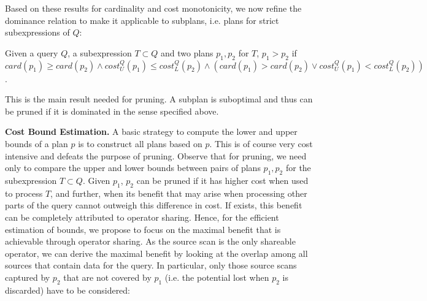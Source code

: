 Based on these results for cardinality and cost monotonicity, we now
refine the dominance relation to make it applicable to subplans,
i.e. plans for strict subexpressions of $Q$:

\begin{theorem}
  \label{def:dominates_bound}
  Given a query $Q$, a subexpression $T \subset Q$ and two plans
  $p_1,p_2$ for $T$, $p_1 > p_2$ if
  $card(p_1) \geq card(p_2) \wedge cost_U^Q(p_1) \leq cost_L^Q(p_2)
  \wedge (card(p_1) > card(p_2) \vee cost_U^Q(p_1) < cost_L^Q(p_2))$.
\end{theorem}

This is the main result needed for pruning. A subplan is suboptimal
and thus can be pruned if it is dominated in the sense specified
above.



\textbf{Cost Bound Estimation.} 
A basic strategy to compute the lower and upper bounds of a plan $p$
is to construct all plans based on $p$. This is of
course very cost intensive and defeats the purpose of pruning. Observe
that for pruning, we need only to compare the upper and lower bounds
between pairs of plans $p_1,p_2$ for the subexpression $T \subset
Q$. Given $p_1$, $p_2$ can be pruned if it has higher cost when used
to process $T$, and further, when its benefit that may arise when
processing other parts of the query cannot outweigh this difference in
cost. If exists, this benefit can be completely attributed to operator
sharing. Hence, for the efficient estimation of bounds, we propose to
focus on the maximal benefit that is achievable through operator
sharing. As the source scan is the only shareable operator, we can
derive the maximal benefit by looking at the overlap among all sources
that contain data for the query. In particular, only those source
scans captured by $p_2$ that are not covered by $p_1$ (i.e. the
potential lost when $p_2$ is discarded) have to be considered:

